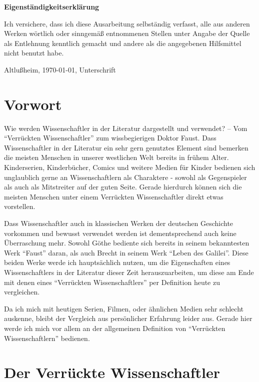 \documentclass[12pt]{scrreprt}
\begin{document}
\makeititle
\begin{center}
	\sffamily\bfseries{Eigenständigkeitserklärung}
\end{center}
Ich versichere, dass ich diese Ausarbeitung selbständig verfasst, alle aus
anderen Werken wörtlich oder sinngemäß entnommenen Stellen unter Angabe der
Quelle als Entlehnung kenntlich gemacht und andere als die angegebenen
Hilfsmittel nicht benutzt habe.

Altlußheim, \today, Unterschrift
\tableofcontents
\listoffigures
\listoftables

\chapter{Vorwort}
	\label{chap:vorwort}
Wie werden Wissenschaftler in der Literatur dargestellt und verwendet? – Vom \enquote{Verrückten Wissenschaftler} zum wissbegierigen Doktor Faust.
\smallskip\newline
Dass Wissenschaftler in der Literatur ein sehr gern genutztes Element sind bemerken die meisten Menschen in unserer westlichen Welt bereits in frühem Alter. 
Kinderserien, Kinderbücher, Comics und weitere Medien für Kinder bedienen sich unglaublich gerne an Wissenschaftlern als Charaktere - sowohl als Gegenspieler als auch als Mitstreiter auf der guten Seite.
Gerade hierdurch können sich die meisten Menschen unter einem Verrückten Wissenschaftler direkt etwas vorstellen.

Dass Wissenschaftler auch in klassischen Werken der deutschen Geschichte vorkommen und bewusst verwendet werden ist dementsprechend auch keine Überraschung mehr.
Sowohl Göthe bediente sich bereits in seinem bekanntesten Werk \enquote{Faust} daran, als auch Brecht in seinem Werk \enquote{Leben des Galilei}.
Diese beiden Werke werde ich hauptsächlich nutzen, um die Eigenschaften eines Wissenschaftlers in der Literatur dieser Zeit herauszuarbeiten, um diese am Ende mit denen eines \enquote{Verrückten Wissenschaftlers} per Definition heute zu vergleichen.

Da ich mich mit heutigen Serien, Filmen, oder ähnlichen Medien sehr schlecht auskenne, bleibt der Vergleich aus persönlicher Erfahrung leider aus.
Gerade hier werde ich mich vor allem an der allgemeinen Definition von \enquote{Verrückten Wissenschaftlern} bedienen.

\chapter{Der Verrückte Wissenschaftler}
	\label{chap:der verrückte Wissenschaftler}
\end{document}
